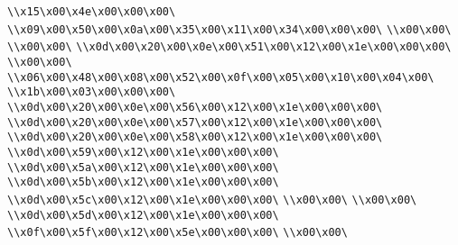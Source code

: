 \verb|\\x15\x00\x4e\x00\x00\x00\|\newline
\verb|\\x09\x00\x50\x00\x0a\x00\x35\x00\x11\x00\x34\x00\x00\x00\|\newline
\verb|\\x00\x00\|\newline
\verb|\\x00\x00\|\newline
\verb|\\x0d\x00\x20\x00\x0e\x00\x51\x00\x12\x00\x1e\x00\x00\x00\|\newline
\verb|\\x00\x00\|\newline
\verb|\\x06\x00\x48\x00\x08\x00\x52\x00\x0f\x00\x05\x00\x10\x00\x04\x00\|\newline
\verb|\\x1b\x00\x03\x00\x00\x00\|\newline
\verb|\\x0d\x00\x20\x00\x0e\x00\x56\x00\x12\x00\x1e\x00\x00\x00\|\newline
\verb|\\x0d\x00\x20\x00\x0e\x00\x57\x00\x12\x00\x1e\x00\x00\x00\|\newline
\verb|\\x0d\x00\x20\x00\x0e\x00\x58\x00\x12\x00\x1e\x00\x00\x00\|\newline
\verb|\\x0d\x00\x59\x00\x12\x00\x1e\x00\x00\x00\|\newline
\verb|\\x0d\x00\x5a\x00\x12\x00\x1e\x00\x00\x00\|\newline
\verb|\\x0d\x00\x5b\x00\x12\x00\x1e\x00\x00\x00\|\newline
\verb|\\x0d\x00\x5c\x00\x12\x00\x1e\x00\x00\x00\|\newline
\verb|\\x00\x00\|\newline
\verb|\\x00\x00\|\newline
\verb|\\x0d\x00\x5d\x00\x12\x00\x1e\x00\x00\x00\|\newline
\verb|\\x0f\x00\x5f\x00\x12\x00\x5e\x00\x00\x00\|\newline
\verb|\\x00\x00\|\newline
